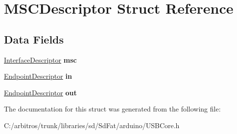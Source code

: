 \hypertarget{struct_m_s_c_descriptor}{\section{M\-S\-C\-Descriptor Struct Reference}
\label{struct_m_s_c_descriptor}
}
\subsection*{Data Fields}
\begin{DoxyCompactItemize}
\item 
\hypertarget{struct_m_s_c_descriptor_af01c68cfcf5830b0d5ff44c2751c12c0}{\hyperlink{struct_interface_descriptor}{Interface\-Descriptor} {\bfseries msc}}\label{struct_m_s_c_descriptor_af01c68cfcf5830b0d5ff44c2751c12c0}

\item 
\hypertarget{struct_m_s_c_descriptor_a93dcef3b3e3062b904269bcad94771b5}{\hyperlink{struct_endpoint_descriptor}{Endpoint\-Descriptor} {\bfseries in}}\label{struct_m_s_c_descriptor_a93dcef3b3e3062b904269bcad94771b5}

\item 
\hypertarget{struct_m_s_c_descriptor_afcf3c947c6e5ace7853bc3e313c0c4aa}{\hyperlink{struct_endpoint_descriptor}{Endpoint\-Descriptor} {\bfseries out}}\label{struct_m_s_c_descriptor_afcf3c947c6e5ace7853bc3e313c0c4aa}

\end{DoxyCompactItemize}


The documentation for this struct was generated from the following file\-:\begin{DoxyCompactItemize}
\item 
C\-:/arbitros/trunk/libraries/sd/\-Sd\-Fat/arduino/U\-S\-B\-Core.\-h\end{DoxyCompactItemize}
